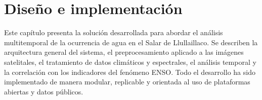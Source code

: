 \chapter{Diseño e implementación} %

\label{Chapter3} %

Este capítulo presenta la solución desarrollada para abordar el análisis multitemporal de la ocurrencia de agua en el Salar de Llullaillaco. Se describen la arquitectura general del sistema, el preprocesamiento aplicado a las imágenes satelitales, el tratamiento de datos climáticos y espectrales, el análisis temporal y la correlación con los indicadores del fenómeno ENSO. Todo el desarrollo ha sido implementado de manera modular, replicable y orientada al uso de plataformas abiertas y datos públicos.



